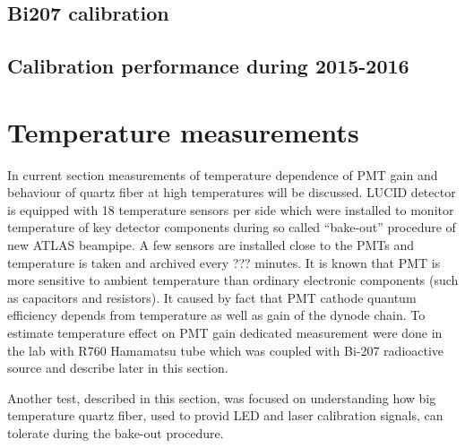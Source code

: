 \subsection{Bi207 calibration}
\label{subsec:bi207Calibration}



\subsection{Calibration performance during 2015-2016}
\label{subsec:calibPerformance}




% 
% 


\section{Temperature measurements}
\label{sec:tempMeas}

In current section measurements of temperature dependence of PMT gain and behaviour of quartz fiber at high temperatures will be discussed.
LUCID detector is equipped with 18 temperature sensors per side which were installed to monitor temperature of key detector components during so called ``bake-out'' procedure of new
ATLAS beampipe. A few sensors are installed close to the PMTs and temperature is taken and archived every ??? minutes.
It is known that PMT is more sensitive to ambient temperature than ordinary electronic components (such as capacitors and resistors).
It caused by fact that PMT cathode quantum efficiency depends from temperature as well as gain of the dynode chain.
To estimate temperature effect on PMT gain dedicated measurement were done in 
the lab with R760 Hamamatsu tube which was coupled with Bi-207 radioactive 
source and describe later in this section.

Another test, described in this section, was focused on understanding how big 
temperature quartz fiber, used to provid LED and laser calibration signals, can 
tolerate during the bake-out procedure.

